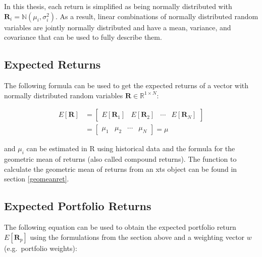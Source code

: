\documentclass[
  oneside, a4paper, 12pt, openany]{book}
\theoremstyle{definition}
\theoremstyle{definition}
\theoremstyle{definition}
\theoremstyle{definition}
\theoremstyle{remark}
\begin{document}
In this thesis, each return is simplified as being normally distributed with \(\pmb{R}_i = \mathbb{N}(\mu_i, \sigma_i^2)\). As a result, linear combinations of normally distributed random variables are jointly normally distributed and have a mean, variance, and covariance that can be used to fully describe them.

\hypertarget{expected-returns}{%
\subsection{Expected Returns}\label{expected-returns}}

The following formula can be used to get the expected returns of a vector with normally distributed random variables \(\pmb{R} \in \mathbb{R}^{1\times N}\):

\begin{align*}
  E[\pmb{R}] &=
  \begin{bmatrix}
    E[\pmb{R}_{1}] & E[\pmb{R}_{2}] & \cdots & E[\pmb{R}_{N}]  
 \end{bmatrix}\\
 &=
 \begin{bmatrix}
    \mu_{1} & \mu_{2} & \cdots & \mu_{N} 
 \end{bmatrix}
 =
 \mu
\end{align*}

and \(\mu_i\) can be estimated in R using historical data and the formula for the geometric mean of returns (also called compound returns). The function to calculate the geometric mean of returns from an xts object can be found in section \ref{geomeanret}.

\hypertarget{expected-portfolio-returns}{%
\subsection{Expected Portfolio Returns}\label{expected-portfolio-returns}}

The following equation can be used to obtain the expected portfolio return \(E[\pmb{R}_p]\) using the formulations from the section above and a weighting vector \(w\) (e.g.~portfolio weights):
\end{document}
